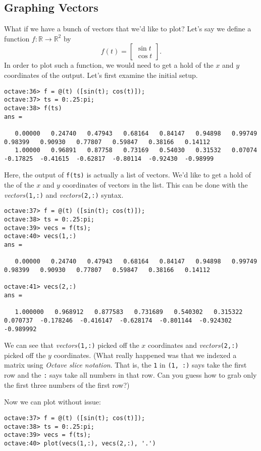 \documentclass[letter]{article}
\newcommand{\R}{\mathbb{R}}
\newcommand{\mat}[1]{\begin{bmatrix}#1\end{bmatrix}}
\begin{document}
	\subsection{Graphing Vectors}
	What if we have a bunch of vectors that we'd like to plot?  Let's say we define a
	function $f:\R\to\R^2$ by
	\[
		f(t)=\mat{\sin t\\\cos t}.
	\]
	In order to plot such a function, we would need to get a hold of the $x$ and $y$ coordinates
	of the output.  
	Let's first examine the initial setup.
	\begin{lstlisting}[style=Matlab-Pyglike,escapechar=`]
octave:36> f = @(t) ([sin(t); cos(t)]);
octave:37> ts = 0:.25:pi;
octave:38> f(ts)
ans =

   0.00000   0.24740   0.47943   0.68164   0.84147   0.94898   0.99749   0.98399   0.90930   0.77807   0.59847   0.38166   0.14112
   1.00000   0.96891   0.87758   0.73169   0.54030   0.31532   0.07074  -0.17825  -0.41615  -0.62817  -0.80114  -0.92430  -0.98999
	\end{lstlisting}
	Here, the output of {\tt f(ts)} is actually a list of vectors.  We'd like to get a hold of the of the $x$ and $y$ coordinates
	of vectors in the list. This can be done with the \emph{vectors}{\tt (1,:)} and \emph{vectors}{\tt (2,:)} syntax.
	\begin{lstlisting}[style=Matlab-Pyglike,escapechar=`]
octave:37> f = @(t) ([sin(t); cos(t)]);
octave:38> ts = 0:.25:pi;
octave:39> vecs = f(ts);
octave:40> vecs(1,:)
ans =

   0.00000   0.24740   0.47943   0.68164   0.84147   0.94898   0.99749   0.98399   0.90930   0.77807   0.59847   0.38166   0.14112

octave:41> vecs(2,:)
ans =

   1.000000   0.968912   0.877583   0.731689   0.540302   0.315322   0.070737  -0.178246  -0.416147  -0.628174  -0.801144  -0.924302  -0.989992
	\end{lstlisting}
	We can see that \emph{vectors}{\tt (1,:)} picked off the $x$ coordinates and \emph{vectors}{\tt (2,:)}
	picked off the $y$ coordinates.  (What really happened was that we indexed a matrix using \emph{{\sc Octave}
	slice notation}.  That is, the {\tt 1} in  {\tt(1, :)} says take the first row and the {\tt :} says take all
	numbers in that row.  Can you guess how to grab only the first three numbers of the first row?)

	Now we can plot without issue:
	\begin{lstlisting}[style=Matlab-Pyglike,escapechar=`]
octave:37> f = @(t) ([sin(t); cos(t)]);
octave:38> ts = 0:.25:pi;
octave:39> vecs = f(ts);
octave:40> plot(vecs(1,:), vecs(2,:), '.')
	\end{lstlisting}
\end{document}
